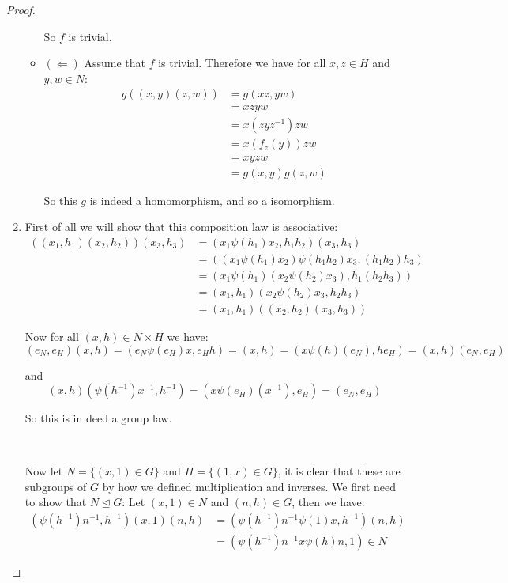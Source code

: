 \begin{exercise}
\begin{proof}
\begin{enumerate}[label = (\alph*)]
\begin{itemize}
                    So $f$ is trivial.
                    \item $(\Leftarrow)$ Assume that $f$ is trivial. Therefore we have for all $x,z\in H$ and $y,w\in N$:\begin{align*}
                        g((x,y)(z,w)) &= g(xz,yw)\\
                        &= xzyw\\
                        &= x(zyz^{-1})zw\\
                        &= x(f_z(y))zw\\
                        &= xyzw\\
                        &= g(x,y)g(z,w)
                    \end{align*}

                    So this $g$ is indeed a homomorphism, and so a isomorphism. 
                \end{itemize}
                \item First of all we will show that this composition law is associative:\begin{align*}
                    ((x_1,h_1)(x_2,h_2))(x_3,h_3) &= ({x_1}{\psi(h_1)x_2}, h_1h_2)(x_3,h_3)\\
                    &= (({x_1}{\psi(h_1)x_2}){\psi(h_1h_2)x_3}, (h_1h_2)h_3)\\
                    &= ({x_1}\psi(h_1)({x_2}{\psi(h_2)x_3}), h_1(h_2h_3))\\
                    &=(x_1,h_1)({x_2}{\psi(h_2)x_3}, h_2h_3)\\
                    &=(x_1,h_1)((x_2,h_2)(x_3,h_3))
                \end{align*}

                Now for all $(x,h)\in N\times H$ we have:\begin{equation*}
                    (e_N,e_H)(x,h) = (e_N\psi(e_H)x,{e_H}h) = (x,h) = (x\psi(h)(e_N),h{e_H}) = (x,h)(e_N,e_H) 
                \end{equation*}

                and \begin{equation*}
                    (x,h)(\psi(h^{-1})x^{-1},h^{-1}) = (x\psi(e_H)(x^{-1}),e_H) = (e_N,e_H)
                \end{equation*}

                So this is in deed a group law.

                \

                Now let $N = \{(x,1)\in G\}$ and $H = \{(1,x)\in G\}$, it is clear that these are subgroups of $G$ by how we defined multiplication and inverses.
                 We first need to show that $N\trianglelefteq G$:
                Let $(x,1)\in N$ and $(n,h)\in G$, then we have:\begin{align*}
                    (\psi(h^{-1})n^{-1},h^{-1})(x,1)(n,h) &= (\psi(h^{-1})n^{-1}\psi(1)x, h^{-1})(n,h)\\
                        &=  (\psi(h^{-1})n^{-1} x \psi(h)n, 1) \in N
                \end{align*}


\end{enumerate}
\end{proof}
\end{exercise}
